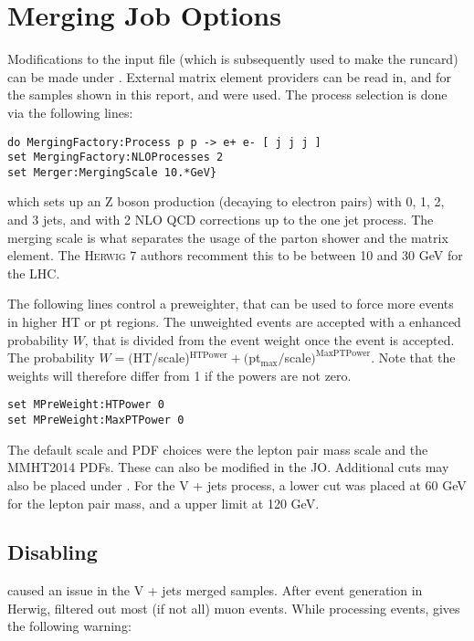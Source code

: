 \section{Merging Job Options}

Modifications to the  input file (which is subsequently used to make the runcard) can be made under . External matrix element providers can be read in, and for the samples shown in this report,  and  were used. The process selection is done via the following lines:

\noindent
\begin{verbatim}
do MergingFactory:Process p p -> e+ e- [ j j j ]
set MergingFactory:NLOProcesses 2
set Merger:MergingScale 10.*GeV}
\end{verbatim}

\noindent
which sets up an Z boson production (decaying to electron pairs) with 0, 1, 2, and 3 jets, and with 2 NLO QCD corrections up to the one jet process. The merging scale is what separates the usage of the parton shower and the matrix element. The \textsc{Herwig 7} authors recomment this to be between 10 and 30 GeV for the LHC.

The following lines control a preweighter, that can be used to force more events in higher HT or pt regions. The unweighted events are accepted with a enhanced probability $W$, that is divided from the event weight once the event is accepted. The probability $W = ($HT/scale)$^{\text{HTPower}} + ($pt$_{\text{max}}/$scale$)^{\text{MaxPTPower}}$. Note that the weights will therefore differ from 1 if the powers are not zero.

\noindent
\begin{verbatim}
set MPreWeight:HTPower 0
set MPreWeight:MaxPTPower 0
\end{verbatim}

The default scale and PDF choices were the lepton pair mass scale and the MMHT2014 PDFs. These can also be modified in the JO. Additional cuts may also be placed under . For the V + jets process, a lower cut was placed at 60 GeV for the lepton pair mass, and a upper limit at 120 GeV.

\subsection{Disabling }

 caused an issue in the V + jets merged samples. After event generation in Herwig,  filtered out most (if not all) muon events. While processing events,  gives the following warning:

